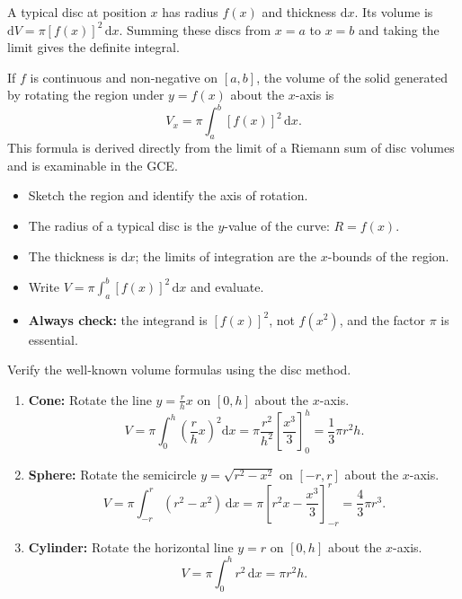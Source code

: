 \documentclass[11pt]{article}
\begin{document}
A typical disc at position $x$ has radius $f(x)$ and thickness $\mathrm{d}x$. Its volume is $\mathrm{d}V = \pi [f(x)]^2\,\mathrm{d}x$. Summing these discs from $x = a$ to $x = b$ and taking the limit gives the definite integral.

\begin{propriete}
If $f$ is continuous and non‑negative on $[a,b]$, the volume of the solid generated by rotating the region under $y = f(x)$ about the $x$-axis is
\[
V_x = \pi \int_a^b [f(x)]^2\,\mathrm{d}x.
\]
This formula is derived directly from the limit of a Riemann sum of disc volumes and is examinable in the GCE.
\end{propriete}

\begin{aretenir}
\begin{itemize}
\item Sketch the region and identify the axis of rotation.
\item The radius of a typical disc is the $y$-value of the curve: $R = f(x)$.
\item The thickness is $\mathrm{d}x$; the limits of integration are the $x$-bounds of the region.
\item Write $V = \pi \int_a^b [f(x)]^2\,\mathrm{d}x$ and evaluate.
\item \textbf{Always check:} the integrand is $[f(x)]^2$, not $f(x^2)$, and the factor $\pi$ is essential.
\end{itemize}
\end{aretenir}

\begin{exemplebox}
Verify the well‑known volume formulas using the disc method.
\begin{enumerate}
\item \textbf{Cone:} Rotate the line $y = \frac{r}{h}x$ on $[0,h]$ about the $x$-axis.
\[
V = \pi \int_0^h \left(\frac{r}{h}x\right)^2\mathrm{d}x = \pi \frac{r^2}{h^2} \left[\frac{x^3}{3}\right]_0^h = \frac{1}{3}\pi r^2 h.
\]
\item \textbf{Sphere:} Rotate the semicircle $y = \sqrt{r^2 - x^2}$ on $[-r,r]$ about the $x$-axis.
\[
V = \pi \int_{-r}^r (r^2 - x^2)\,\mathrm{d}x = \pi \left[ r^2x - \frac{x^3}{3} \right]_{-r}^r = \frac{4}{3}\pi r^3.
\]
\item \textbf{Cylinder:} Rotate the horizontal line $y = r$ on $[0,h]$ about the $x$-axis.
\[
V = \pi \int_0^h r^2\,\mathrm{d}x = \pi r^2 h.
\]
\end{enumerate}
\end{exemplebox}
\end{document}

